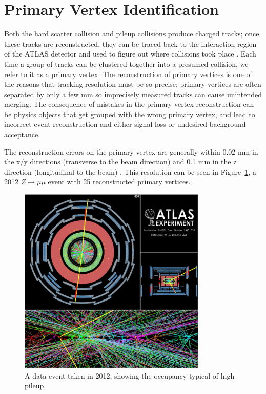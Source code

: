 \section{Primary Vertex Identification}
\label{sec:pv}
Both the hard scatter collision and pileup collisions produce charged tracks; once these tracks are reconstructed, they can 
be traced back to the interaction region of the ATLAS detector and used to figure out where collisions took place
.  Each time a group of tracks can be clustered together into a presumed collision, we refer to it 
as a primary vertex.  The reconstruction of primary vertices is one of the reasons that tracking resolution must be 
so precise; primary vertices are often separated by only a few mm so imprecisely measured tracks can cause unintended 
merging.  The consequence of mistakes in the primary vertex reconstruction can be physics objects that get grouped with the 
wrong primary vertex, and lead to incorrect event reconstruction and either signal loss or undesired background acceptance.

The reconstruction errors on the primary vertex are generally within 0.02 mm in the x/y directions 
(transverse to the beam direction) and 0.1 mm in the z direction (longitudinal to the  
beam) \cite{pileup_tracks}.   This resolution can be seen in Figure~\ref{fig:pileup_pv}, a 2012 
$Z\rightarrow\mu\mu$ event with 25 reconstructed primary vertices.



\begin{figure}
	\includegraphics[width=0.8\textwidth]{ReconstructionPerformance/images/2012_highPileup.pdf}
	\caption{A data event taken in 2012, showing the occupancy typical of high pileup. 	\label{fig:pileup_pv}  }
\end{figure}


